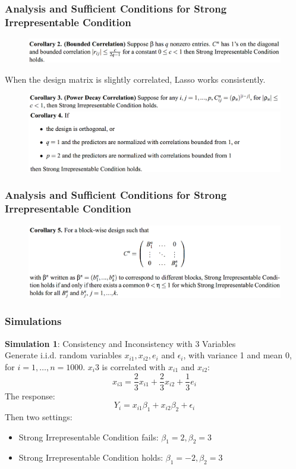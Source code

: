 \documentclass{beamer}
\begin{document}
	\begin{frame}
		\frametitle{Analysis and Sufficient Conditions for Strong Irrepresentable Condition}
		\begin{figure}
			\includegraphics[width=1\linewidth]{image011.png}
		\end{figure}
		When the design matrix is slightly correlated, Lasso works consistently.
		\begin{figure}
			\includegraphics[width=1\linewidth]{image012.png}
			\includegraphics[width=1\linewidth]{image013.png}
		\end{figure}
	\end{frame}
	
	\begin{frame}
		\frametitle{Analysis and Sufficient Conditions for Strong Irrepresentable Condition}
		\begin{figure}
			\includegraphics[width=1\linewidth]{image014.png}
		\end{figure}	
	\end{frame}
	
	\begin{frame}
		\frametitle{Simulations}
		\textbf{Simulation 1}: Consistency and Inconsistency with 3 Variables\\
		Generate i.i.d. random variables $x_{i1}, x_{i2}, e_i$ and $\epsilon_i$, with variance 1 and mean 0, for $i=1,\ldots,n=1000$. $x_i3$ is correlated with $x_{i1}$ and $x_{i2}$:
		$$x_{i3} = \frac{2}{3}x_{i1} + \frac{2}{3}x_{i2} + \frac{1}{3}e_i$$
		The response:
		$$Y_i = x_{i1}\beta_1 + x_{i2}\beta_2 + \epsilon_i$$
		Then two settings:
		\begin{itemize}
			\item 
			Strong Irrepresentable Condition fails: $\beta_1 = 2, \beta_2 = 3$ 
			\item
			Strong Irrepresentable Condition holds: $\beta_1 = -2, \beta_2 = 3$ 
		\end{itemize}
	\end{frame}
	
\end{document}
